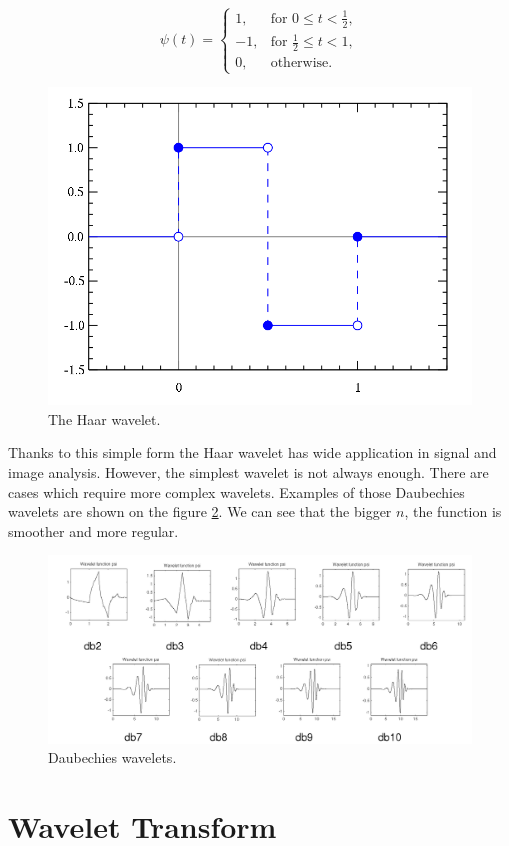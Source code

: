 \begin{equation}
\psi(t)=
\begin{cases}
1, & \text{for } 0 \leq t < \frac{1}{2}, \\
-1, & \text{for } \frac{1}{2} \leq t < 1, \\
0, & \text{otherwise}.
\end{cases}
\end{equation}

\begin{figure}[h]
	\centering
	\includegraphics[width=.5\textwidth]{Haar_wavelet.png}
	\caption{The Haar wavelet.}
	\label{fig:haar}
\end{figure}

Thanks to this simple form the Haar wavelet has wide application in signal and image analysis.
However, the simplest wavelet is not always enough. There are cases which require more complex wavelets. Examples of those Daubechies wavelets are shown on the figure \ref{fig:db_wavelets}. We can see that the bigger $n$, the function is smoother and more regular.

\begin{figure}[h]
	\centering
	\includegraphics[width=\textwidth]{DB_N.png}
	\caption{Daubechies wavelets.}
	\label{fig:db_wavelets}
\end{figure}

\section{Wavelet Transform}

